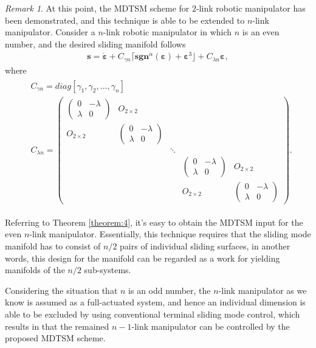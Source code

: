 \documentclass[3p]{elsarticle}
\theoremstyle{plain}
\theoremstyle{remark}
\newtheorem{myrem}{Remark}
\begin{document}
\begin{myrem}
At this point, the MDTSM scheme for $2$-link robotic manipulator has been demonstrated, and this technique is able to be extended to $n$-link manipulator. Consider a $n$-link robotic manipulator in which $n$ is an even number, and the desired sliding manifold follows
\begin{align}
\bm s = \dot{\bm \varepsilon}+C_{\gamma n}\lceil\bm{sgn}^\alpha(\bm \varepsilon)+\bm\varepsilon^3\rfloor+C_{\lambda n}{\bm\varepsilon},
\end{align}
where
\begin{align}
\begin{split}
&C_{\gamma n}=diag[\gamma_1,\gamma_2,\ldots,\gamma_n]\\
&C_{\lambda n}=
\begin{pmatrix}
\begin{pmatrix}
0 &-\lambda\\ \lambda &0
\end{pmatrix} &O_{2\times 2} & & &\\
O_{2\times 2} &\begin{pmatrix}
0 &-\lambda\\ \lambda &0
\end{pmatrix} & & &\\
& &\ddots & &\\
& & &\begin{pmatrix}
0 &-\lambda\\ \lambda &0
\end{pmatrix} &O_{2\times 2}\\
& & &O_{2\times 2} &\begin{pmatrix}
0 &-\lambda\\ \lambda &0
\end{pmatrix}
\end{pmatrix}.
\end{split}
\end{align}\par
Referring to Theorem \ref{theorem:4}, it's easy to obtain the MDTSM input for the even $n$-link manipulator. Essentially, this technique requires that the sliding mode manifold has to consist of $n/2$ pairs of individual sliding surfaces, in another words, this design for the manifold can be regarded as a work for yielding manifolds of the $n/2$ sub-systems.\par
Considering the situation that $n$ is an odd number, the $n$-link manipulator as we know is assumed as a full-actuated system, and hence an individual dimension is able to be excluded by using conventional terminal sliding mode control, which results in that the remained $n-1$-link manipulator can be controlled by the proposed MDTSM scheme.
\end{myrem}
\end{document}

